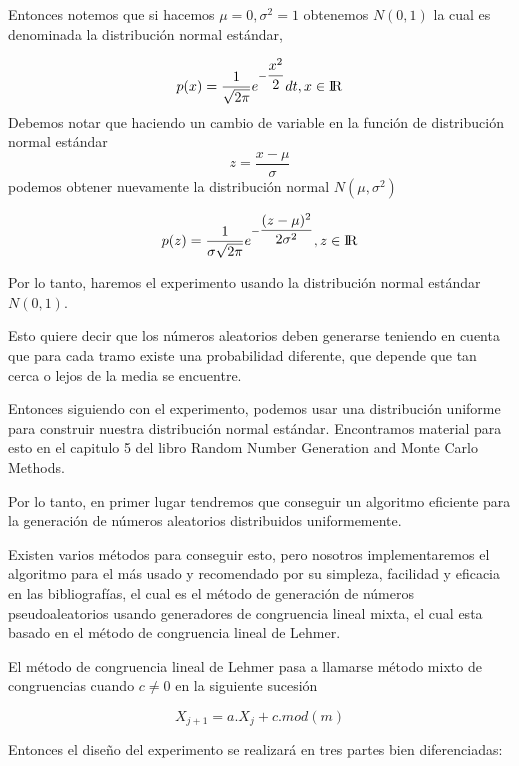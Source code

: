 \documentclass[conference,a4paper]{IEEEtran}
\begin{document}
Entonces notemos que si hacemos $\mu=0,\sigma^2=1$ obtenemos $N(0,1)$
la cual es denominada la distribuci\'on normal est\'andar, 
 
$$p(x) = \dfrac {1}{\sqrt{2\pi}}
e^{-\dfrac{x^2}{2}} dt, x \in {\rm I\!R} $$
Debemos notar que haciendo un cambio de variable en la funci\'on de distribuci\'on normal est\'andar $$z=\dfrac{x-\mu}{\sigma}$$ podemos obtener nuevamente la distribuci\'on normal $N(\mu,\sigma^2)$ 

$$p(z) = \dfrac {1}{\sigma\sqrt{2\pi}}
e^{-\dfrac{(z-\mu)^2}{2\sigma^2}} , z \in {\rm I\!R} $$

Por lo tanto, haremos el experimento usando la distribuci\'on normal est\'andar $N(0,1)$.

Esto quiere decir que los n\'umeros aleatorios deben generarse teniendo en cuenta que para cada tramo existe una probabilidad diferente, que depende que tan cerca o lejos de la media se encuentre.

Entonces siguiendo con el experimento, podemos usar una distribuci\'on uniforme para construir nuestra distribuci\'on normal est\'andar. Encontramos material para esto en el capitulo 5 del libro Random Number Generation and Monte Carlo Methods\cite{b3}.

Por lo tanto, en primer lugar tendremos que conseguir un algoritmo eficiente para la generaci\'on de n\'umeros aleatorios distribuidos uniformemente. 

Existen varios m\'etodos para conseguir esto, pero nosotros implementaremos el algoritmo para el m\'as usado y recomendado por su simpleza, facilidad y eficacia en las bibliograf\'ias, el cual es el m\'etodo de generaci\'on de n\'umeros pseudoaleatorios usando generadores de congruencia lineal mixta, el cual esta basado en el m\'etodo de congruencia lineal de Lehmer.

El m\'etodo de congruencia lineal de Lehmer pasa a llamarse m\'etodo mixto de congruencias cuando $c \not= 0$ en la siguiente sucesi\'on

\begin{equation}
X_{j+1} = a.X_{j}+c.mod(m)
\end{equation}


Entonces el dise\~no del experimento se realizar\'a en tres partes bien diferenciadas:\\
\end{document}
